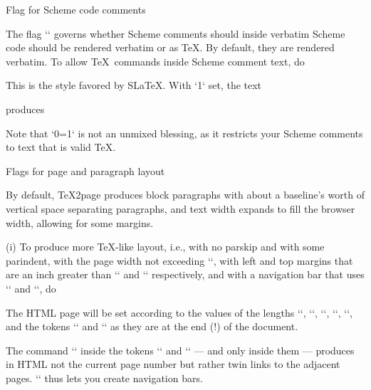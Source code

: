\beginsection Flag for Scheme code comments

The flag `\TZPslatexcomments` governs whether Scheme comments
should inside verbatim Scheme code should be rendered verbatim or as \TeX.
By default, they are rendered verbatim.   To allow \TeX\ commands inside
Scheme comment text, do

\begintt
\let\TZPslatexcomments=1
\endtt
%
This is the style favored by S\LaTeX.
\ifx\shipout\UnDeFiNeD
With `\TZPslatexcomments` set, the text

\begintt
{}
\endtt
%
produces
\let\TZPslatexcomments 1

\let\TZPslatexcomments 0

\fi
Note that `\TZPslatexcomments=1` is not an unmixed blessing, as it
restricts your Scheme comments to text that is valid \TeX.

\beginsection Flags for page and paragraph layout

%
By default, \TeX2page produces block paragraphs with about a
baseline’s worth of vertical space separating paragraphs, and text width
expands to fill the browser width, allowing for some margins.

\item(i) To produce more \TeX-like layout, i.e., with no parskip and
with some parindent,
with the page width not exceeding `\hsize`,
with left and top margins that are an inch greater than
`\hoffset` and `\voffset` respectively, and with a
navigation bar that uses `\headline` and `\footline`,
do

\begintt
\let\TZPtexlayout=1
\endtt

%
The HTML page will be set according to the values of the
lengths `\hsize`, `\hoffset`, `\voffset`,
`\parskip`, `\parindent`, and the tokens `\headline`
and `\footline` as they are at the end (!) of
the document.

The command `\folio` inside the tokens `\headline` and `\footline`
— and only inside them —
produces in HTML not the current page number but rather twin links to the
adjacent pages. `\folio` thus lets you create navigation
bars.

